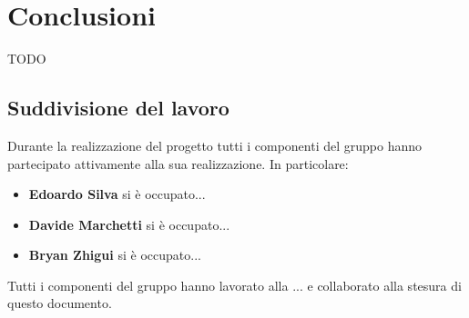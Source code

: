 \documentclass[11pt,italian]{article}
\begin{document}
\newpage
\section{Conclusioni}
TODO

\subsection{Suddivisione del lavoro}
Durante la realizzazione del progetto tutti i componenti del gruppo hanno partecipato attivamente alla sua realizzazione. In particolare:
\begin{itemize}
  \item \textbf{Edoardo Silva} si è occupato...
  \item \textbf{Davide Marchetti} si è occupato...
  \item \textbf{Bryan Zhigui} si è occupato...
\end{itemize}

\noindent
Tutti i componenti del gruppo hanno lavorato alla ... e collaborato alla stesura di questo documento.
\end{document}
